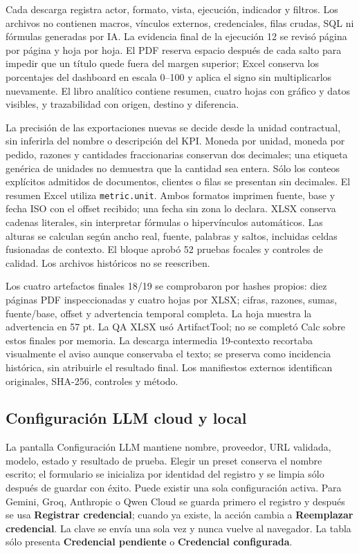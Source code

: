 \documentclass[11pt,letterpaper]{article}
\newcommand{\file}[1]{\texttt{#1}}
\begin{document}
Cada descarga registra actor, formato, vista, ejecución, indicador y filtros. Los archivos no contienen macros, vínculos externos, credenciales, filas crudas, SQL ni fórmulas generadas por IA. La evidencia final de la ejecución 12 se revisó página por página y hoja por hoja. El PDF reserva espacio después de cada salto para impedir que un título quede fuera del margen superior; Excel conserva los porcentajes del dashboard en escala 0--100 y aplica el signo sin multiplicarlos nuevamente. El libro analítico contiene resumen, cuatro hojas con gráfico y datos visibles, y trazabilidad con origen, destino y diferencia.

La precisión de las exportaciones nuevas se decide desde la unidad contractual,
sin inferirla del nombre o descripción del KPI. Moneda por unidad, moneda por
pedido, razones y cantidades fraccionarias conservan dos decimales; una etiqueta
genérica de unidades no demuestra que la cantidad sea entera. Sólo los conteos
explícitos admitidos de documentos, clientes o filas se presentan sin decimales.
El resumen Excel utiliza \file{metric.unit}. Ambos formatos imprimen fuente,
base y fecha ISO con el offset recibido; una fecha sin zona lo declara. XLSX
conserva cadenas literales, sin interpretar fórmulas o hipervínculos automáticos.
Las alturas se calculan según ancho real, fuente, palabras y saltos, incluidas
celdas fusionadas de contexto. El bloque aprobó 52 pruebas focales y controles de
calidad. Los archivos históricos no se reescriben.

Los cuatro artefactos finales 18/19 se comprobaron por hashes propios: diez páginas
PDF inspeccionadas y cuatro hojas por XLSX; cifras, razones, sumas, fuente/base,
offset y advertencia temporal completa. La hoja muestra la advertencia en 57 pt.
La QA XLSX usó ArtifactTool; no se completó Calc sobre estos finales por memoria.
La descarga intermedia 19-contexto recortaba visualmente el aviso aunque conservaba
el texto; se preserva como incidencia histórica, sin atribuirle el resultado final.
Los manifiestos externos identifican originales, SHA-256, controles y método.

\subsection{Configuración LLM cloud y local}

La pantalla Configuración LLM mantiene nombre, proveedor, URL validada, modelo, estado y resultado de prueba. Elegir un preset conserva el nombre escrito; el formulario se inicializa por identidad del registro y se limpia sólo después de guardar con éxito. Puede existir una sola configuración activa. Para Gemini, Groq, Anthropic o Qwen Cloud se guarda primero el registro y después se usa \textbf{Registrar credencial}; cuando ya existe, la acción cambia a \textbf{Reemplazar credencial}. La clave se envía una sola vez y nunca vuelve al navegador. La tabla sólo presenta \textbf{Credencial pendiente} o \textbf{Credencial configurada}.
\end{document}
